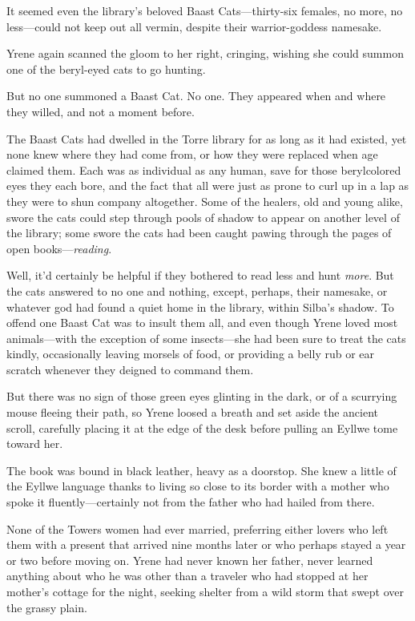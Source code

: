 It seemed even the library's beloved Baast Cats---thirty-six females, no more, no less---could not keep out all vermin, despite their warrior-goddess namesake.

Yrene again scanned the gloom to her right, cringing, wishing she could summon one of the beryl-eyed cats to go hunting.

But no one summoned a Baast Cat.
No one.
They appeared when and where they willed, and not a moment before.

The Baast Cats had dwelled in the Torre library for as long as it had existed, yet none knew where they had come from, or how they were replaced when age claimed them.
Each was as individual as any human, save for those berylcolored eyes they each bore, and the fact that all were just as prone to curl up in a lap as they were to shun company altogether.
Some of the healers, old and young alike, swore the cats could step through pools of shadow to appear on another level of the library; some swore the cats had been caught pawing through the pages of open books---\emph{reading}.

Well, it'd certainly be helpful if they bothered to read less and hunt \emph{more}.
But the cats answered to no one and nothing, except, perhaps, their namesake, or whatever god had found a quiet home in the library, within Silba's shadow.
To offend one Baast Cat was to insult them all, and even though Yrene loved most animals---with the exception of some insects---she had been sure to treat the cats kindly, occasionally leaving morsels of food, or providing a belly rub or ear scratch whenever they deigned to command them.

But there was no sign of those green eyes glinting in the dark, or of a scurrying mouse fleeing their path, so Yrene loosed a breath and set aside the ancient scroll, carefully placing it at the edge of the desk before pulling an Eyllwe tome toward her.

The book was bound in black leather, heavy as a doorstop.
She knew a little of the Eyllwe language thanks to living so close to its border with a mother who spoke it fluently---certainly not from the father who had hailed from there.

None of the Towers women had ever married, preferring either lovers who left them with a present that arrived nine months later or who perhaps stayed a year or two before moving on.
Yrene had never known her father, never learned anything about who he was other than a traveler who had stopped at her mother's cottage for the night, seeking shelter from a wild storm that swept over the grassy plain.

